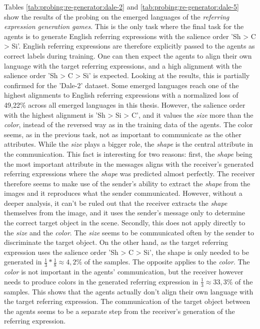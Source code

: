 Tables \ref{tab:probing:re-generator:dale-2} and \ref{tab:probing:re-generator:dale-5} show the results of the probing on the emerged languages of the \emph{referring expression generation games}.
This is the only task where the final task for the agents is to generate English referring expressions with the salience order 'Sh > C > Si'.
English referring expressions are therefore explicitly passed to the agents as correct labels during training.
One can then expect the agents to align their own language with the target referring expressions, and a high alignment with the salience order 'Sh > C > Si' is expected.
Looking at the results, this is partially confirmed for the 'Dale-2' dataset.
Some emerged languages reach one of the highest alignments to English referring expressions  with a normalized loss of 49,22\% across all emerged languages in this thesis.
However, the salience order with the highest alignment is 'Sh > Si > C', and it values the \emph{size} more than the \emph{color}, instead of the reversed way as in the training data of the agents.
The color seems, as in the previous task, not as important to communicate as the other attributes.
While the \emph{size} plays a bigger role, the \emph{shape} is the central attribute in the communication.
This fact is interesting for two reasons:
first, the \emph{shape} being the most important attribute in the messages aligns with the receiver's generated referring expressions where the \emph{shape} was predicted almost perfectly.
The receiver therefore seems to make use of the sender's ability to extract the \emph{shape} from the images and it reproduces what the sender communicated.
However, without a deeper analysis, it can't be ruled out that the receiver extracts the \emph{shape} themselves from the image, and it uses the sender's message only to determine the correct target object in the scene.
Secondly, this does not apply directly to the \emph{size} and the \emph{color}.
The \emph{size} seems to be communicated often by the sender to discriminate the target object.
On the other hand, as the target referring expression uses the salience order 'Sh > C > Si', the shape is only needed to be generated in $\frac{1}{3} * \frac{1}{8} \approx 4,2\%$ of the samples.
The opposite applies to the \emph{color}.
The \emph{color} is not important in the agents' communication, but the receiver however needs to produce colors in the generated referring expression in $\frac{1}{3} \approx 33,3\%$ of the samples.
This shows that the agents actually don't align their own language with the target referring expression.
The communication of the target object between the agents seems to be a separate step from the receiver's generation of the referring expression.

